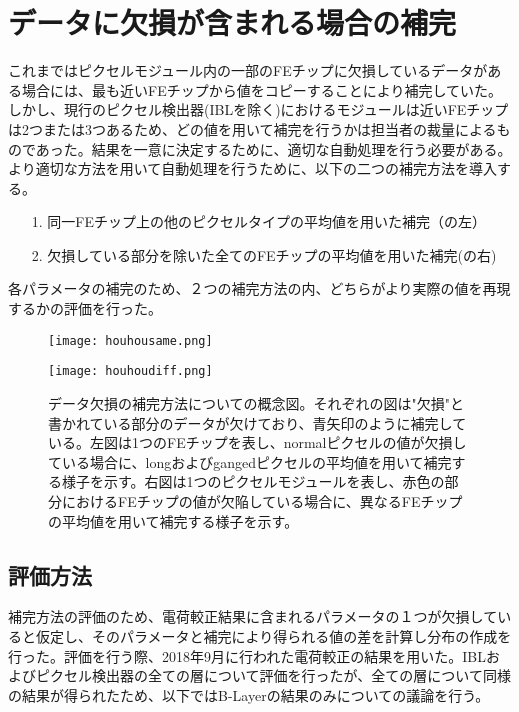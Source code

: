 \section{データに欠損が含まれる場合の補完}
\label{sec:kessonhosei}
これまではピクセルモジュール内の一部のFEチップに欠損しているデータがある場合には、最も近いFEチップから値をコピーすることにより補完していた。しかし、現行のピクセル検出器(IBLを除く)におけるモジュールは近いFEチップは2つまたは3つあるため、どの値を用いて補完を行うかは担当者の裁量によるものであった。結果を一意に決定するために、適切な自動処理を行う必要がある。より適切な方法を用いて自動処理を行うために、以下の二つの補完方法を導入する。
\begin{itemize}
  \item[1. ] 同一FEチップ上の他のピクセルタイプの平均値を用いた補完（の左）
  \item[2. ] 欠損している部分を除いた全てのFEチップの平均値を用いた補完(の右)
\end{itemize}
各パラメータの補完のため、２つの補完方法の内、どちらがより実際の値を再現するかの評価を行った。

\begin{figure}[tbp]
  \begin{minipage}[b]{0.45\linewidth}
    \centering
    \texttt{[image: houhousame.png]}
  \end{minipage}
  \begin{minipage}[b]{0.55\linewidth}
    \centering
    \texttt{[image: houhoudiff.png]}
  \end{minipage}
  \caption[データ欠損の補完方法]{データ欠損の補完方法についての概念図。それぞれの図は"欠損"と書かれている部分のデータが欠けており、青矢印のように補完している。左図は1つのFEチップを表し、normalピクセルの値が欠損している場合に、longおよびgangedピクセルの平均値を用いて補完する様子を示す。右図は1つのピクセルモジュールを表し、赤色の部分におけるFEチップの値が欠陥している場合に、異なるFEチップの平均値を用いて補完する様子を示す。}
  \label{fig:houhouhou}
\end{figure}


\subsection{評価方法}
補完方法の評価のため、電荷較正結果に含まれるパラメータの１つが欠損していると仮定し、そのパラメータと補完により得られる値の差を計算し分布の作成を行った。評価を行う際、2018年9月に行われた電荷較正の結果を用いた。IBLおよびピクセル検出器の全ての層について評価を行ったが、全ての層について同様の結果が得られたため、以下ではB-Layerの結果のみについての議論を行う。

